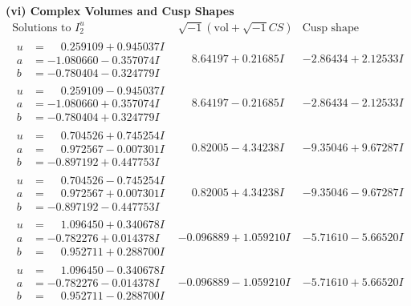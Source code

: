 \documentclass[1p]{elsarticle_modified}
\theoremstyle{definition}
\newcommand{\I}{\sqrt{-1}}
\begin{document}
\newpage\flushleft \textbf{(vi) Complex Volumes and Cusp Shapes}
$$\begin{array}{c|c|c}  
\text{Solutions to }I^u_{2}& \I (\text{vol} + \sqrt{-1}CS) & \text{Cusp shape}\\
 \hline 
\begin{aligned}
u &= \phantom{-}0.259109 + 0.945037 I \\
a &= -1.080660 - 0.357074 I \\
b &= -0.780404 - 0.324779 I\end{aligned}
 & \phantom{-}8.64197 + 0.21685 I & -2.86434 + 2.12533 I \\ \hline\begin{aligned}
u &= \phantom{-}0.259109 - 0.945037 I \\
a &= -1.080660 + 0.357074 I \\
b &= -0.780404 + 0.324779 I\end{aligned}
 & \phantom{-}8.64197 - 0.21685 I & -2.86434 - 2.12533 I \\ \hline\begin{aligned}
u &= \phantom{-}0.704526 + 0.745254 I \\
a &= \phantom{-}0.972567 - 0.007301 I \\
b &= -0.897192 + 0.447753 I\end{aligned}
 & \phantom{-}0.82005 - 4.34238 I & -9.35046 + 9.67287 I \\ \hline\begin{aligned}
u &= \phantom{-}0.704526 - 0.745254 I \\
a &= \phantom{-}0.972567 + 0.007301 I \\
b &= -0.897192 - 0.447753 I\end{aligned}
 & \phantom{-}0.82005 + 4.34238 I & -9.35046 - 9.67287 I \\ \hline\begin{aligned}
u &= \phantom{-}1.096450 + 0.340678 I \\
a &= -0.782276 + 0.014378 I \\
b &= \phantom{-}0.952711 + 0.288700 I\end{aligned}
 & -0.096889 + 1.059210 I & -5.71610 - 5.66520 I \\ \hline\begin{aligned}
u &= \phantom{-}1.096450 - 0.340678 I \\
a &= -0.782276 - 0.014378 I \\
b &= \phantom{-}0.952711 - 0.288700 I\end{aligned}
 & -0.096889 - 1.059210 I & -5.71610 + 5.66520 I \\ \hline\begin{aligned}

\end{aligned}
\end{array}$$
\end{document}
